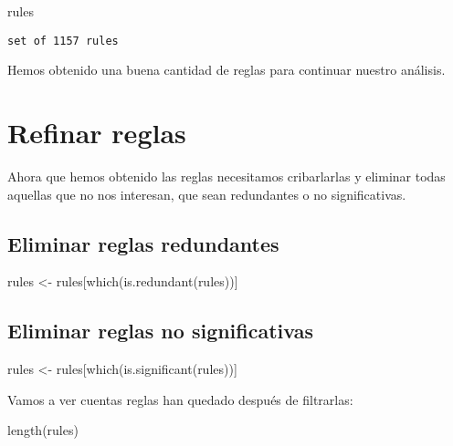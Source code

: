 \documentclass[
  letterpaper,
  DIV=11,
  numbers=noendperiod]{scrreprt}
\newenvironment{Shaded}{\begin{snugshade}}{\end{snugshade}}
\newcommand{\FunctionTok}[1]{\textcolor[rgb]{0.28,0.35,0.67}{#1}}
\newcommand{\NormalTok}[1]{\textcolor[rgb]{0.00,0.23,0.31}{#1}}
\newcommand{\OtherTok}[1]{\textcolor[rgb]{0.00,0.23,0.31}{#1}}
\begin{document}
\begin{Shaded}
\begin{Highlighting}[]
\NormalTok{ rules}
\end{Highlighting}
\end{Shaded}

\begin{verbatim}
set of 1157 rules 
\end{verbatim}

Hemos obtenido una buena cantidad de reglas para continuar nuestro
análisis.

\section{Refinar reglas}\label{refinar-reglas}

Ahora que hemos obtenido las reglas necesitamos cribarlarlas y eliminar
todas aquellas que no nos interesan, que sean redundantes o no
significativas.

\subsection{Eliminar reglas
redundantes}\label{eliminar-reglas-redundantes}

\begin{Shaded}
\begin{Highlighting}[]
\NormalTok{rules }\OtherTok{\textless{}{-}}\NormalTok{ rules[}\FunctionTok{which}\NormalTok{(}\FunctionTok{is.redundant}\NormalTok{(rules))]}
\end{Highlighting}
\end{Shaded}

\subsection{Eliminar reglas no
significativas}\label{eliminar-reglas-no-significativas}

\begin{Shaded}
\begin{Highlighting}[]
\NormalTok{rules }\OtherTok{\textless{}{-}}\NormalTok{ rules[}\FunctionTok{which}\NormalTok{(}\FunctionTok{is.significant}\NormalTok{(rules))]}
\end{Highlighting}
\end{Shaded}

Vamos a ver cuentas reglas han quedado después de filtrarlas:

\begin{Shaded}
\begin{Highlighting}[]
\FunctionTok{length}\NormalTok{(rules)}
\end{Highlighting}
\end{Shaded}
\end{document}
